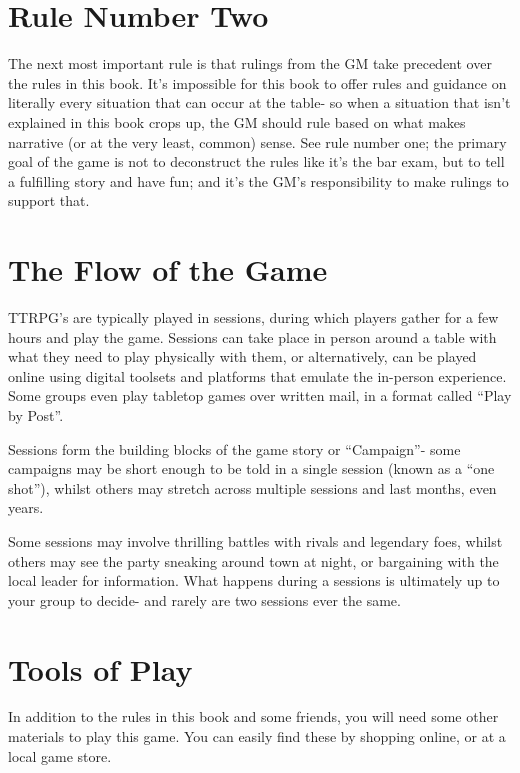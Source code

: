 \documentclass[
  11pt,
  letterpaper,
]{scrbook}
\begin{document}
\section{Rule Number Two}\label{rule-number-two}

The next most important rule is that rulings from the GM take precedent
over the rules in this book. It's impossible for this book to offer
rules and guidance on literally every situation that can occur at the
table- so when a situation that isn't explained in this book crops up,
the GM should rule based on what makes narrative (or at the very least,
common) sense. See rule number one; the primary goal of the game is not
to deconstruct the rules like it's the bar exam, but to tell a
fulfilling story and have fun; and it's the GM's responsibility to make
rulings to support that.

\section{The Flow of the Game}\label{the-flow-of-the-game}

TTRPG's are typically played in sessions, during which players gather
for a few hours and play the game. Sessions can take place in person
around a table with what they need to play physically with them, or
alternatively, can be played online using digital toolsets and platforms
that emulate the in-person experience. Some groups even play tabletop
games over written mail, in a format called ``Play by Post''.

Sessions form the building blocks of the game story or ``Campaign''-
some campaigns may be short enough to be told in a single session (known
as a ``one shot''), whilst others may stretch across multiple sessions
and last months, even years.

Some sessions may involve thrilling battles with rivals and legendary
foes, whilst others may see the party sneaking around town at night, or
bargaining with the local leader for information. What happens during a
sessions is ultimately up to your group to decide- and rarely are two
sessions ever the same.

\newpage

\section{Tools of Play}\label{tools-of-play}

In addition to the rules in this book and some friends, you will need
some other materials to play this game. You can easily find these by
shopping online, or at a local game store.
\end{document}
